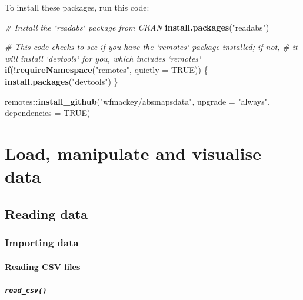 \documentclass[]{book}
\newenvironment{Shaded}{\begin{snugshade}}{\end{snugshade}}
\newcommand{\CommentTok}[1]{\textcolor[rgb]{0.56,0.35,0.01}{\textit{#1}}}
\newcommand{\ControlFlowTok}[1]{\textcolor[rgb]{0.13,0.29,0.53}{\textbf{#1}}}
\newcommand{\DataTypeTok}[1]{\textcolor[rgb]{0.13,0.29,0.53}{#1}}
\newcommand{\KeywordTok}[1]{\textcolor[rgb]{0.13,0.29,0.53}{\textbf{#1}}}
\newcommand{\NormalTok}[1]{#1}
\newcommand{\OperatorTok}[1]{\textcolor[rgb]{0.81,0.36,0.00}{\textbf{#1}}}
\newcommand{\OtherTok}[1]{\textcolor[rgb]{0.56,0.35,0.01}{#1}}
\newcommand{\StringTok}[1]{\textcolor[rgb]{0.31,0.60,0.02}{#1}}
\begin{document}
To install these packages, run this code:

\begin{Shaded}
\begin{Highlighting}[]
\CommentTok{# Install the `readabs` package from CRAN}
\KeywordTok{install.packages}\NormalTok{(}\StringTok{"readabs"}\NormalTok{)}

\CommentTok{# This code checks to see if you have the `remotes` package installed; if not,}
\CommentTok{# it will install `devtools` for you, which includes `remotes`}
\ControlFlowTok{if}\NormalTok{(}\OperatorTok{!}\KeywordTok{requireNamespace}\NormalTok{(}\StringTok{"remotes"}\NormalTok{, }\DataTypeTok{quietly =} \OtherTok{TRUE}\NormalTok{)) \{}
  \KeywordTok{install.packages}\NormalTok{(}\StringTok{"devtools"}\NormalTok{)}
\NormalTok{\}}

\NormalTok{remotes}\OperatorTok{::}\KeywordTok{install_github}\NormalTok{(}\StringTok{"wfmackey/absmapsdata"}\NormalTok{,}
                        \DataTypeTok{upgrade =} \StringTok{"always"}\NormalTok{,}
                        \DataTypeTok{dependencies =} \OtherTok{TRUE}\NormalTok{)}
\end{Highlighting}
\end{Shaded}

\hypertarget{part-load-manipulate-and-visualise-data}{%
\part{Load, manipulate and visualise data}\label{part-load-manipulate-and-visualise-data}}

\hypertarget{reading-data}{%
\chapter{Reading data}\label{reading-data}}

\hypertarget{importing-data}{%
\section{Importing data}\label{importing-data}}

\hypertarget{reading-csv-files}{%
\subsection{Reading CSV files}\label{reading-csv-files}}

\hypertarget{read_csv}{%
\subsubsection{\texorpdfstring{\texttt{read\_csv()}}{read\_csv()}}\label{read_csv}}
\end{document}
